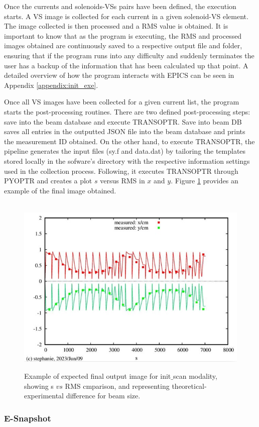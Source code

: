 \documentclass{article}
\begin{document}
Once the currents and solenoids-VSs pairs have been defined, the execution starts. A VS image is collected for each current in a given solenoid-VS element. The image collected is then processed and a RMS value is obtained. It is important to know that as the program is executing, the RMS and processed images obtained are continuously saved to a respective output file and folder, ensuring that if the program runs into any difficulty and suddenly terminates the user has a backup of the information that has been calculated up that point. A detailed overview of how the program interacts with EPICS can be seen in Appendix \ref{appendix:init_exe}.

Once all VS images have been collected for a given current list, the program starts the post-processing routines. There are two defined post-processing steps: save into the beam database and execute TRANSOPTR. Save into beam DB saves all entries in the outputted JSON file into the beam database and prints the measurement ID obtained. On the other hand, to execute TRANSOPTR, the pipeline generates the input files (sy.f and data.dat) by tailoring the templates stored locally in the sofware's directory with the respective information settings used in the collection process. Following, it executes TRANSOPTR through PYOPTR and creates a plot $s$ versus RMS in $x$ and $y$. Figure \ref{fig:14} provides an example of the final image obtained. 

\begin{figure}[!h]  
    \centerline{\ \includegraphics[width=0.7\linewidth]{images/sol_scan_transoptr_img.jpg}}
    \caption{Example of expected final output image for init$\_$scan modality, showing s $vs$ RMS cmparison, and  representing theoretical-experimental difference for beam size.}
    \label{fig:14}
\end{figure} 
    
\subsubsection{E-Snapshot}
\end{document}
